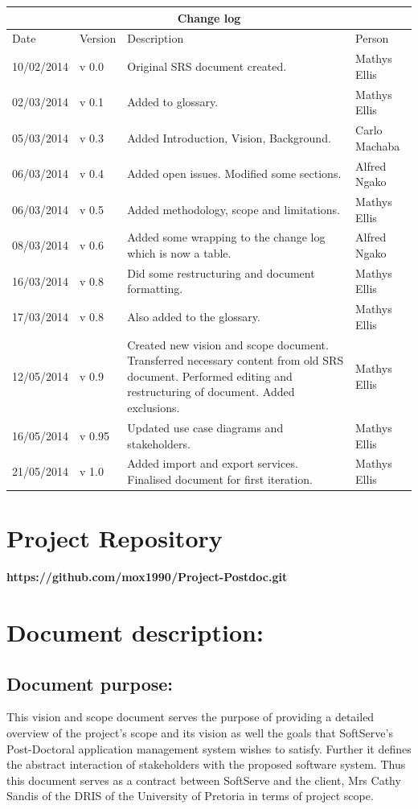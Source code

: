 \documentclass[12pt]{article}
\newcommand{\repo}{https://github.com/mox1990/Project-Postdoc.git}
\begin{document}
\begin{center}
\begin{tabular}{|l|p{1.4cm}|p{8cm}|p{2.8cm}|}
\hline
\multicolumn{4}{|c|}{\bf Change log} \\
\hline
 Date & Version & Description &  Person \\
\hline
10/02/2014 & v 0.0 & Original SRS document created. & Mathys Ellis \\
\hline
02/03/2014 & v 0.1 & Added to glossary. & Mathys Ellis \\
\hline
05/03/2014 & v 0.3 & Added Introduction, Vision, Background. & Carlo Machaba \\
\hline
06/03/2014 & v 0.4 & Added open issues. Modified some sections. & Alfred Ngako \\
\hline
06/03/2014 & v 0.5 & Added methodology, scope and limitations. & Mathys Ellis \\
\hline
08/03/2014 & v 0.6 & Added some wrapping to the change log which is now a table. & Alfred Ngako \\
\hline
16/03/2014 & v 0.8 & Did some restructuring and document formatting. & Mathys Ellis \\
\hline
17/03/2014 & v 0.8 & Also added to the glossary. & Mathys Ellis \\
\hline
12/05/2014 & v 0.9 & Created new vision and scope document. Transferred necessary content from old SRS document. Performed editing and restructuring of document. Added exclusions. & Mathys Ellis \\
\hline
16/05/2014 & v 0.95 & Updated use case diagrams and stakeholders. & Mathys Ellis \\
\hline
21/05/2014 & v 1.0 & Added import and export services. Finalised document for first iteration. & Mathys Ellis \\
\hline

\end{tabular}
\end{center}
\newpage
\tableofcontents

\listoffigures
\newpage
\section{Project Repository}
\textbf{\repo}
\newpage
\section{Document description:}

\subsection{Document purpose:}
\vspace{0.2in}
This vision and scope document serves the purpose of providing a detailed overview of the project's scope and its vision as well the goals that SoftServe's Post-Doctoral application management system wishes to satisfy. Further it defines the abstract interaction of stakeholders with the proposed software system. Thus this document serves as a contract between SoftServe and the client, Mrs Cathy Sandis of the DRIS of the University of Pretoria in terms of project scope.
\end{document}
